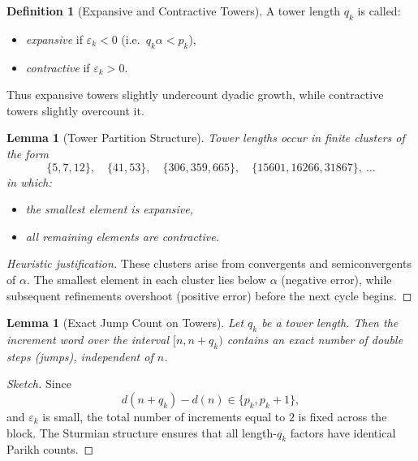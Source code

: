\documentclass[12pt, oneside]{article}
\numberwithin{equation}{section}
\theoremstyle{definition}
\newtheorem{definition}{Definition}[section]
\theoremstyle{plain}
\newtheorem{lemma}[theorem]{Lemma}
\theoremstyle{remark}
\begin{document}

\begin{definition}[Expansive and Contractive Towers]
A tower length $q_k$ is called:
\begin{itemize}
\item \emph{expansive} if $\varepsilon_k < 0$ (i.e.\ $q_k\alpha < p_k$),
\item \emph{contractive} if $\varepsilon_k > 0$.
\end{itemize}
\end{definition}

Thus expansive towers slightly undercount dyadic growth, while
contractive towers slightly overcount it.


\begin{lemma}[Tower Partition Structure]
\label{lem:tower-partition}
Tower lengths occur in finite clusters of the form
\[
\{5,7,12\},\quad
\{41,53\},\quad
\{306,359,665\},\quad
\{15601,16266,31867\},\ \dots
\]
in which:
\begin{itemize}
\item the smallest element is expansive,
\item all remaining elements are contractive.
\end{itemize}
\end{lemma}

\begin{proof}[Heuristic justification]
These clusters arise from convergents and semiconvergents of $\alpha$.
The smallest element in each cluster lies below $\alpha$ (negative error),
while subsequent refinements overshoot (positive error) before the next
cycle begins.
\end{proof}


\begin{lemma}[Exact Jump Count on Towers]
\label{lem:exact-jumps}
Let $q_k$ be a tower length.  Then the increment word over the interval
$[n,n+q_k)$ contains an exact number of double steps (jumps), independent
of $n$.
\end{lemma}

\begin{proof}[Sketch]
Since
\[
d(n+q_k)-d(n) \in \{p_k, p_k+1\},
\]
and $\varepsilon_k$ is small, the total number of increments equal to $2$
is fixed across the block.  The Sturmian structure ensures that all
length-$q_k$ factors have identical Parikh counts.
\end{proof}
\end{document}
